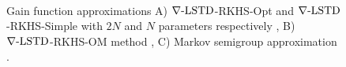 \begin{figure}[htbp]
	\centering
	\mbox{
	}
	\mbox{
	}
	\mbox{
	}
	\caption[$\gradTD$-RKHS algorithms for $d=2,5,10$]{Gain function approximations A) $\gradTD$-RKHS-Opt and $\gradTD$-RKHS-Simple with $2N$ and $N$ parameters respectively \cite{radmey18a}, B) $\gradTD$-RKHS-OM method \cite{radmey19}, C) Markov semigroup approximation \cite{tagmeh16}.}
	\label{fig:diff_td_rkhs_coif_d2510}
\end{figure}

